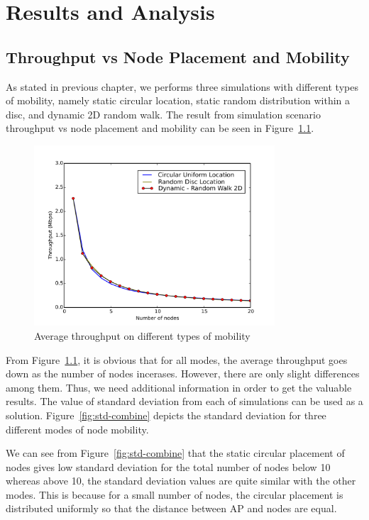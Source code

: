 \chapter{Results and Analysis}

\section{Throughput vs Node Placement and Mobility}

As stated in previous chapter, we performs three simulations with different types of mobility, namely static circular location, static random distribution within a disc, and dynamic 2D random walk. The result from simulation scenario throughput vs node placement and mobility can be seen in Figure~\ref{fig:result-mobility-combine}. 

\begin{figure}[H]
    \centering
    \includegraphics[width=0.8\textwidth]{figures/result-mobility-combine}
    \caption{Average throughput on different types of mobility}
    \label{fig:result-mobility-combine}
\end{figure}

From Figure~\ref{fig:result-mobility-combine}, it is obvious that for all modes, the average throughput goes down as the number of nodes incerases. However, there are only slight differences among them. Thus, we need additional information in order to get the valuable results. The value of standard deviation from each of simulations can be used as a solution. Figure~\ref{fig:std-combine} depicts the standard deviation for three different modes of node mobility.

We can see from Figure~\ref{fig:std-combine} that the static circular placement of nodes gives low standard deviation for the total number of nodes below 10 whereas above 10, the standard deviation values are quite similar with the other modes. This is because for a small number of nodes, the circular placement is distributed uniformly so that the distance between AP and nodes are equal.

